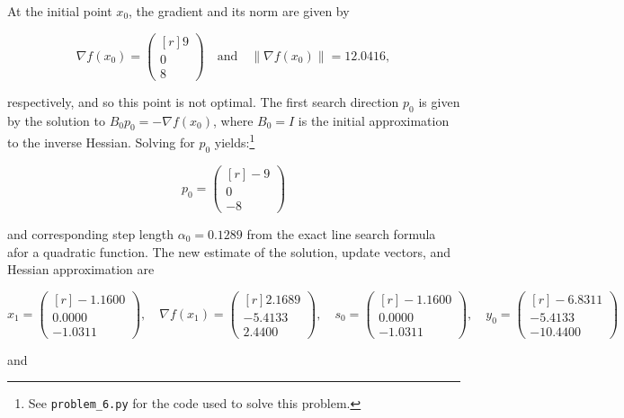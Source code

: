 \begin{solution}
    At the initial point $x_0$, the gradient and its norm are given by

    $$
    \nabla f(x_0) = \begin{pmatrix*}[r]
         9 \\
         0 \\
         8
    \end{pmatrix*} \quad \text{and} \quad \| \nabla f(x_0) \| = 12.0416, 
    $$

    respectively, and so this point is not optimal. The first search direction $p_0$ is given by the solution to 
    $B_0 p_0 = -\nabla f(x_0)$, where $B_0 = I$ is the initial approximation to the inverse Hessian. Solving for $p_0$ 
    yields:\footnote{
        See \texttt{problem\_6.py} for the code used to solve this problem.
    }

    $$
    p_0 = \begin{pmatrix*}[r]
        -9 \\
         0 \\
        -8
    \end{pmatrix*}
    $$

    and corresponding step length $\alpha_0 = 0.1289$ from the exact line search formula afor a quadratic function.
    The new estimate of the solution, update vectors, and Hessian approximation are 

    $$
    x_1 = \begin{pmatrix*}[r]
        -1.1600 \\
         0.0000 \\
        -1.0311
    \end{pmatrix*}, \quad \nabla f(x_1) = \begin{pmatrix*}[r]
         2.1689 \\
        -5.4133 \\
         2.4400
    \end{pmatrix*}, \quad s_0 = \begin{pmatrix*}[r]
        -1.1600 \\
         0.0000 \\
        -1.0311
    \end{pmatrix*}, \quad y_0 = \begin{pmatrix*}[r]
        -6.8311 \\
        -5.4133 \\
        -10.4400
    \end{pmatrix*}
    $$

    and 


\end{solution}
